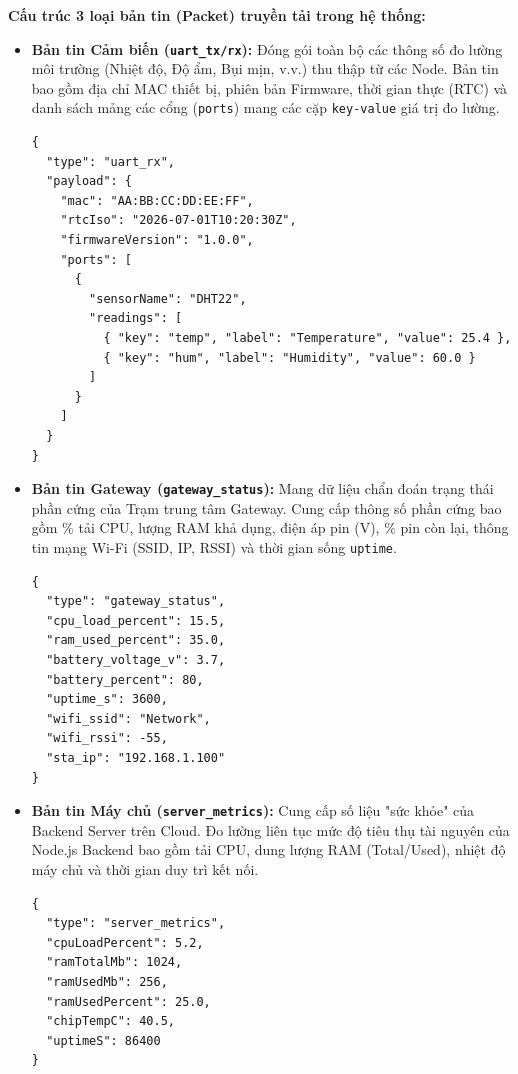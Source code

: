 \documentclass{article}
\begin{document}
\textbf{Cấu trúc 3 loại bản tin (Packet) truyền tải trong hệ thống:}
\begin{itemize}
    \item \textbf{Bản tin Cảm biến (\texttt{uart\_tx/rx}):} Đóng gói toàn bộ các thông số đo lường môi trường (Nhiệt độ, Độ ẩm, Bụi mịn, v.v.) thu thập từ các Node. Bản tin bao gồm địa chỉ MAC thiết bị, phiên bản Firmware, thời gian thực (RTC) và danh sách mảng các cổng (\texttt{ports}) mang các cặp \texttt{key-value} giá trị đo lường.
\begin{verbatim}
{
  "type": "uart_rx",
  "payload": {
    "mac": "AA:BB:CC:DD:EE:FF",
    "rtcIso": "2026-07-01T10:20:30Z",
    "firmwareVersion": "1.0.0",
    "ports": [
      {
        "sensorName": "DHT22",
        "readings": [
          { "key": "temp", "label": "Temperature", "value": 25.4 },
          { "key": "hum", "label": "Humidity", "value": 60.0 }
        ]
      }
    ]
  }
}
\end{verbatim}
    \item \textbf{Bản tin Gateway (\texttt{gateway\_status}):} Mang dữ liệu chẩn đoán trạng thái phần cứng của Trạm trung tâm Gateway. Cung cấp thông số phần cứng bao gồm \% tải CPU, lượng RAM khả dụng, điện áp pin (V), \% pin còn lại, thông tin mạng Wi-Fi (SSID, IP, RSSI) và thời gian sống \texttt{uptime}.
\begin{verbatim}
{
  "type": "gateway_status",
  "cpu_load_percent": 15.5,
  "ram_used_percent": 35.0,
  "battery_voltage_v": 3.7,
  "battery_percent": 80,
  "uptime_s": 3600,
  "wifi_ssid": "Network",
  "wifi_rssi": -55,
  "sta_ip": "192.168.1.100"
}
\end{verbatim}
    \item \textbf{Bản tin Máy chủ (\texttt{server\_metrics}):} Cung cấp số liệu "sức khỏe" của Backend Server trên Cloud. Đo lường liên tục mức độ tiêu thụ tài nguyên của Node.js Backend bao gồm tải CPU, dung lượng RAM (Total/Used), nhiệt độ máy chủ và thời gian duy trì kết nối.
\begin{verbatim}
{
  "type": "server_metrics",
  "cpuLoadPercent": 5.2,
  "ramTotalMb": 1024,
  "ramUsedMb": 256,
  "ramUsedPercent": 25.0,
  "chipTempC": 40.5,
  "uptimeS": 86400
}
\end{verbatim}
\end{itemize}
\end{document}
